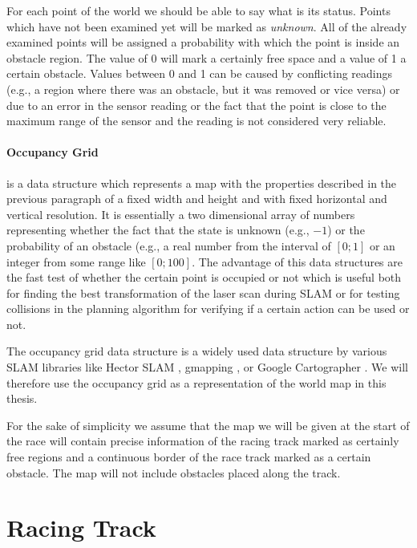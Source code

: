 For each point of the world we should be able to say what is its status. Points which have not been examined yet will be marked as \textit{unknown}. All of the already examined points will be assigned a probability with which the point is inside an obstacle region. The value of 0 will mark a certainly free space and a value of 1 a certain obstacle. Values between 0 and 1 can be caused by conflicting readings (e.g., a region where there was an obstacle, but it was removed or vice versa) or due to an error in the sensor reading or the fact that the point is close to the maximum range of the sensor and the reading is not considered very reliable.

\paragraph{Occupancy Grid} is a data structure which represents a map with the properties described in the previous paragraph of a fixed width and height and with fixed horizontal and vertical resolution. It is essentially a two dimensional array of numbers representing whether the fact that the state is unknown (e.g., $-1$) or the probability of an obstacle (e.g., a real number from the interval of $[0; 1]$ or an integer from some range like $[0; 100]$. The advantage of this data structures are the fast test of whether the certain point is occupied or not which is useful both for finding the best transformation of the laser scan during SLAM or for testing collisions in the planning algorithm for verifying if a certain action can be used or not.


The occupancy grid data structure is a widely used data structure by various SLAM libraries like Hector SLAM \cite{hector}, gmapping \cite{gmapping}, or Google Cartographer \cite{google_cartographer}. We will therefore use the occupancy grid as a representation of the world map in this thesis.

For the sake of simplicity we assume that the map we will be given at the start of the race will contain precise information of the racing track marked as certainly free regions and a continuous border of the race track marked as a certain obstacle. The map will not include obstacles placed along the track.

\section{Racing Track}

